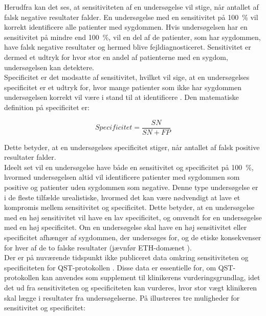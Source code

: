 Herudfra kan det ses, at sensitiviteten af en undersøgelse vil stige, når antallet af falsk negative resultater falder. En undersøgelse med en sensitivitet på 100~\% vil korrekt identificere alle patienter med sygdommen. Hvis undersøgelsen har en sensitivitet på mindre end 100~\%, vil en del af de patienter, som har sygdommen, have falsk negative resultater og hermed blive fejldiagnosticeret. Sensitivitet er dermed et udtryk for hvor stor en andel af patienterne med en sygdom, undersøgelsen kan detektere. \citep{Lalkhen2008} \\
Specificitet er det modsatte af sensitivitet, hvilket vil sige, at en undersøgelses specificitet er et udtryk for, hvor mange patienter som ikke har sygdommen undersøgelsen korrekt vil være i stand til at identificere \citep{Lalkhen2008}. Den matematiske definition på specificitet er: \\
\begin{center}
	\begin{equation}
	Specificitet=\frac{SN}{SN+FP}
	\end{equation}
\end{center}

Dette betyder, at en undersøgelses specificitet stiger, når antallet af falsk positive resultater falder. \citep{Lalkhen2008} \\
Ideelt set vil en undersøgelse have både en sensitivitet og specificitet på 100~\%, hvormed undersøgelsen altid vil identificere patienter med sygdommen som positive og patienter uden sygdommen som negative. Denne type undersøgelse er i de fleste tilfælde urealistiske, hvormed det kan være nødvendigt at lave et kompromis mellem sensitivitet og specificitet. Dette betyder, at en undersøgelse med en høj sensitivitet vil have en lav specificitet, og omvendt for en undersøgelse med en høj specificitet. Om en undersøgelse skal have en høj sensitivitet eller specificitet afhænger af sygdommen, der undersøges for, og de etiske konsekvenser for hver af de to falske resultater (jævnfør ETH-domænet ). \\
Der er på nuværende tidspunkt ikke publiceret data omkring sensitiviteten og specificiteten for QST-protokollen \citep{Wylde2013}. Disse data er essentielle for, om QST-protokollen kan anvendes som supplement til klinikerens vurderingsgrundlag, idet det ud fra sensitiviteten og specificiteten kan vurderes, hvor stor vægt klinikeren skal lægge i resultater fra undersøgelserne. På  illustreres tre muligheder for sensitivitet og specificitet:

